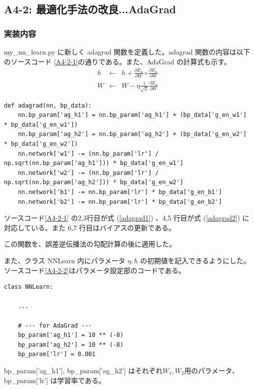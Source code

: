 \documentclass[a4paper,dvipdfmx]{jsarticle}
\begin{document}
\subsection*{A4-2: 最適化手法の改良...AdaGrad}

\subsubsection*{実装内容}
my\_nn\_learn.py に新しく adagrad 関数を定義した。adagrad 関数の内容は以下のソースコード \ref{A4-2-1}の通りである。また、AdaGrad の計算式も示す。
 \begin{eqnarray}
 \label{adagrad1}
 h & \leftarrow & h + \frac{\partial E_n}{\partial W} \circ \frac{\partial E_n}{\partial W} \\
 \label{adagrad2}
 W & \leftarrow & W - \eta \frac{1}{\sqrt{h}} \frac{\partial E_n}{\partial W}
 \end{eqnarray}
 
\begin{lstlisting}[caption="AdaGrad",label=A4-2-1]
def adagrad(nn, bp_data):
    nn.bp_param['ag_h1'] = nn.bp_param['ag_h1'] + (bp_data['g_en_w1'] * bp_data['g_en_w1'])
    nn.bp_param['ag_h2'] = nn.bp_param['ag_h2'] + (bp_data['g_en_w2'] * bp_data['g_en_w2'])
    nn.network['w1'] -= (nn.bp_param['lr'] / np.sqrt(nn.bp_param['ag_h1'])) * bp_data['g_en_w1']
    nn.network['w2'] -= (nn.bp_param['lr'] / np.sqrt(nn.bp_param['ag_h2'])) * bp_data['g_en_w2']
    nn.network['b1'] -= nn.bp_param['lr'] * bp_data['g_en_b1']
    nn.network['b2'] -= nn.bp_param['lr'] * bp_data['g_en_b2']
\end{lstlisting}

ソースコード\ref{A4-2-1} の2,3行目が式 (\ref{adagrad1}) 、4,5 行目が式 (\ref{adagrad2}) に対応している。また 6,7 行目はバイアスの更新である。

この関数を、誤差逆伝播法の勾配計算の後に適用した。

また、クラス NNLearn 内にパラメータ $\eta, h$ の初期値を記入できるようにした。ソースコード\ref{A4-2-2}はパラメータ設定部のコードである。
\begin{lstlisting}[caption="AdaGrad のパラメータ設定部",label=A4-2-2]
class NNLearn:

	...
	
    # --- for AdaGrad ---
    bp_param['ag_h1'] = 10 ** (-8)
    bp_param['ag_h2'] = 10 ** (-8)
    bp_param['lr'] = 0.001
\end{lstlisting}

bp\_param['ag\_h1'], bp\_param['ag\_h2'] はそれぞれ$W_1, W_2$用のパラメータ、bp\_param['lr'] は学習率である。
\end{document}
